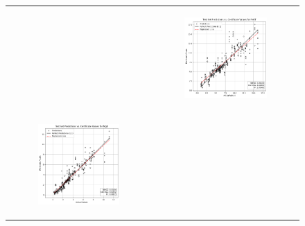 \begin{figure}
{\begin{tabular}{cc}
\begin{subfigure}{0.5\textwidth}
            \end{subfigure} & \hspace{3cm}
            \begin{subfigure}{0.5\textwidth}
                \includegraphics[width=\textwidth]{images/one_to_one/svr/FeOT.png}
            \end{subfigure} \\
            \begin{subfigure}{0.5\textwidth}
                \includegraphics[width=\textwidth]{images/one_to_one/svr/MgO.png}

\end{subfigure}
\end{tabular}}
\end{figure}

